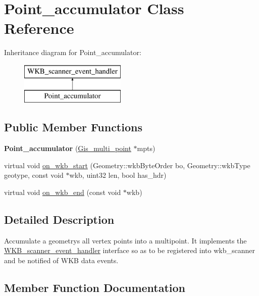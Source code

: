 \hypertarget{classPoint__accumulator}{}\section{Point\+\_\+accumulator Class Reference}
\label{classPoint__accumulator}
Inheritance diagram for Point\+\_\+accumulator\+:\begin{figure}[H]
\begin{center}
\leavevmode
\includegraphics[height=2.000000cm]{classPoint__accumulator}
\end{center}
\end{figure}
\subsection*{Public Member Functions}
\begin{DoxyCompactItemize}
\item 
\mbox{\label{classPoint__accumulator_ac47bf984706bf8231205cb64c819edf9}} 
{\bfseries Point\+\_\+accumulator} (\mbox{\hyperlink{classGis__multi__point}{Gis\+\_\+multi\+\_\+point}} $\ast$mpts)
\item 
virtual void \mbox{\hyperlink{classPoint__accumulator_a2ea2b707dbcca3fc3b891340567c7793}{on\+\_\+wkb\+\_\+start}} (Geometry\+::wkb\+Byte\+Order bo, Geometry\+::wkb\+Type geotype, const void $\ast$wkb, uint32 len, bool has\+\_\+hdr)
\item 
virtual void \mbox{\hyperlink{classPoint__accumulator_a83a4d28319329e91016d71dec5c7bed3}{on\+\_\+wkb\+\_\+end}} (const void $\ast$wkb)
\end{DoxyCompactItemize}


\subsection{Detailed Description}
Accumulate a geometry\textquotesingle{}s all vertex points into a multipoint. It implements the \mbox{\hyperlink{classWKB__scanner__event__handler}{W\+K\+B\+\_\+scanner\+\_\+event\+\_\+handler}} interface so as to be registered into wkb\+\_\+scanner and be notified of W\+KB data events. 

\subsection{Member Function Documentation}
\mbox{\label{classPoint__accumulator_a83a4d28319329e91016d71dec5c7bed3}} 
